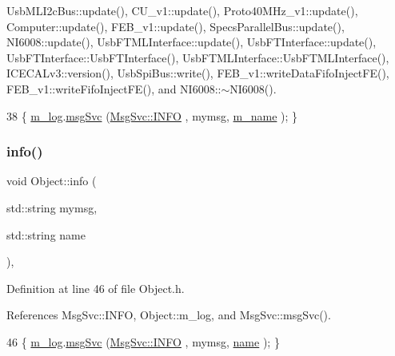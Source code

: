 Usb\+M\+L\+I2c\+Bus\+::update(), C\+U\+\_\+v1\+::update(), Proto40\+M\+Hz\+\_\+v1\+::update(), Computer\+::update(), F\+E\+B\+\_\+v1\+::update(), Specs\+Parallel\+Bus\+::update(), N\+I6008\+::update(), Usb\+F\+T\+M\+L\+Interface\+::update(), Usb\+F\+T\+Interface\+::update(), Usb\+F\+T\+Interface\+::\+Usb\+F\+T\+Interface(), Usb\+F\+T\+M\+L\+Interface\+::\+Usb\+F\+T\+M\+L\+Interface(), I\+C\+E\+C\+A\+Lv3\+::version(), Usb\+Spi\+Bus\+::write(), F\+E\+B\+\_\+v1\+::write\+Data\+Fifo\+Inject\+F\+E(), F\+E\+B\+\_\+v1\+::write\+Fifo\+Inject\+F\+E(), and N\+I6008\+::$\sim$\+N\+I6008().


\begin{DoxyCode}
38 \{ \hyperlink{classObject_a0d269813dd7ac1f24bc143031e2963f2}{m\_log}.\hyperlink{classMsgSvc_ad25f18047920cc59a314e5098259711c}{msgSvc} (\hyperlink{classMsgSvc_ae671eb7301996cd049d2da8a65925926ad2fcf3f3e734fc41ee097cc23670ce51}{MsgSvc::INFO}    , mymsg, \hyperlink{classObject_a8b83c95c705d2c3ba0d081fe1710f48d}{m\_name} ); \}
\end{DoxyCode}
\mbox{\label{classObject_a1ca123253dfd30fc28b156f521dcbdae}} 
\subsubsection{\texorpdfstring{info()}{info()}\hspace{0.1cm}{\footnotesize\ttfamily [2/2]}}
{\footnotesize\ttfamily void Object\+::info (\begin{DoxyParamCaption}\item[{std\+::string}]{mymsg,  }\item[{std\+::string}]{name }\end{DoxyParamCaption})\hspace{0.3cm}{\ttfamily [inline]}, {\ttfamily [inherited]}}



Definition at line 46 of file Object.\+h.



References Msg\+Svc\+::\+I\+N\+FO, Object\+::m\+\_\+log, and Msg\+Svc\+::msg\+Svc().


\begin{DoxyCode}
46 \{ \hyperlink{classObject_a0d269813dd7ac1f24bc143031e2963f2}{m\_log}.\hyperlink{classMsgSvc_ad25f18047920cc59a314e5098259711c}{msgSvc} (\hyperlink{classMsgSvc_ae671eb7301996cd049d2da8a65925926ad2fcf3f3e734fc41ee097cc23670ce51}{MsgSvc::INFO}    , mymsg, \hyperlink{classObject_a300f4c05dd468c7bb8b3c968868443c1}{name} ); \}
\end{DoxyCode}
\mbox{\label{classAttrib_a704f26af560909ad22065083bb7d4c34}} 
